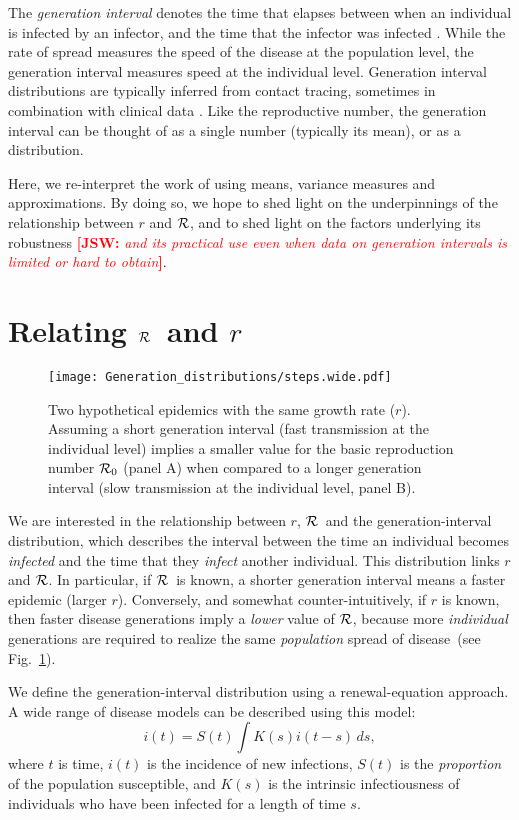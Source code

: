 \documentclass[12pt,]{article}
\newcommand{\RR}{\ensuremath{{\cal R}}}
\newcommand{\Rx}[1]{\ensuremath{{\cal R}_{#1}}}
\newcommand{\Ro}{\Rx{0}}
\newcommand{\fref}[1]{Fig.~\ref{fig:#1}}
\newcommand{\comment}[3]{\textcolor{#1}{\textbf{[#2: }\textit{#3}\textbf{]}}}
\newcommand{\jsw}[1]{\comment{red}{JSW}{#1}}
\begin{document}
The \emph{generation interval} denotes the time that elapses between when an individual is infected by an infector, and the time that the infector was infected \cite{Sven07}.
While the rate of spread measures the speed of the disease at the population level, the generation interval measures speed at the individual level.
Generation interval distributions are typically inferred from contact tracing, sometimes in combination with clinical data \cite{GenerationMeasurement}.
Like the reproductive number, the generation interval can be thought of as a single number (typically its mean), or as a distribution.

Here, we re-interpret the work of \cite{WallLips07} using means, variance measures and approximations.
By doing so, we hope to shed light on the underpinnings of the relationship between $r$ and \RR, and to shed light on the factors underlying its robustness \jsw{and its practical use even when data on generation intervals is limited or hard to obtain}.

\section{Relating \RR\ and $r$}

\begin{figure}[htbp] \centering
	\texttt{[image: Generation\_distributions/steps.wide.pdf]}
	\caption{Two hypothetical epidemics with the same growth rate ($r$).  Assuming a short generation interval (fast transmission at the individual level) implies a smaller value for the basic reproduction number $\Ro$ (panel A) when compared to a longer generation interval (slow transmission at the individual level, panel B).
	\label{fig:link}}
\end{figure}

We are interested in the relationship between $r$, \RR~and the generation-interval distribution, which describes the interval between the time an individual becomes \emph{infected} and the time that they \emph{infect} another individual.
This distribution links $r$ and \RR. In particular, if \RR~is known, a shorter generation interval means a faster epidemic (larger $r$). Conversely, and somewhat counter-intuitively, if $r$ is known, then faster disease generations imply a \emph{lower} value of \RR, because more \emph{individual} generations are required to realize the same \emph{population} spread of disease~(see \fref{link}).

We define the generation-interval distribution using a renewal-equation approach.
A wide range of disease models can be described using this model: 
\begin{equation}
i(t) = S(t)\int{K(s)i(t-s) \,ds},
\label{eq:Renewal}
\end{equation}
where $t$ is time, $i(t)$ is the incidence of new infections, $S(t)$ is the \emph{proportion} of the population susceptible, and $K(s)$ is the intrinsic infectiousness of individuals who have been infected for a length of time $s$.
\end{document}
